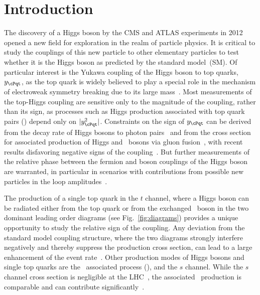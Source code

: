 \section{Introduction}\label{sec:intro}
The discovery of a Higgs boson by the CMS and ATLAS experiments in 2012~\cite{Chatrchyan:2012ufa,Aad:2012tfa} opened a new field for exploration in the realm of particle physics.
It is critical to study the couplings of this new particle to other elementary particles to test whether it is the Higgs boson as predicted by the standard model~(SM).
Of particular interest is the Yukawa coupling of the Higgs boson to top quarks, $y_\cPqt$, as the top quark is widely believed to play a special role in the mechanism of electroweak symmetry breaking due to its large mass~\cite{topmasscms}.
Most measurements of the top-Higgs coupling are sensitive only to the magnitude of the coupling, rather than its sign, as processes such as Higgs production associated with top quark pairs (\ttH) depend only on $|y_\cPqt^2|$.
Constraints on the sign of $y_\cPqt$ can be derived from the decay rate of Higgs bosons to photon pairs~\cite{Biswas} and from the cross section for associated production of Higgs and \Z\ bosons via gluon fusion~\cite{Hespel:2015zea}, with recent results disfavoring negative signs of the coupling~\cite{ATLAS-couplings,Khachatryan:2014jba,Khachatryan:2016vau}.
But further measurements of the relative phase between the fermion and boson couplings of the Higgs boson are warranted, in particular in scenarios with contributions from possible new particles in the loop amplitudes~\cite{Ellis}.

The production of a single top quark in the $t$ channel, where a Higgs boson can be radiated either from the top quark or from the exchanged \PW\ boson in the two dominant leading order diagrams (see Fig.~\ref{fig:diagrams}) provides a unique opportunity to study the relative sign of the coupling.
Any deviation from the standard model coupling structure, where the two diagrams strongly interfere negatively and thereby suppress the production cross section, can lead to a large enhancement of the event rate~\cite{Bordes:1992jy,Tait:2000sh,Farina}.
Other production modes of Higgs bosons and single top quarks are the \PW\ associated process (\tHW), and the $s$ channel.
While the $s$ channel cross section is negligible at the LHC~\cite{Demartin:2015uha}, the associated \tHW\ production is comparable and can contribute significantly~\cite{Demartin:2016axk}.

